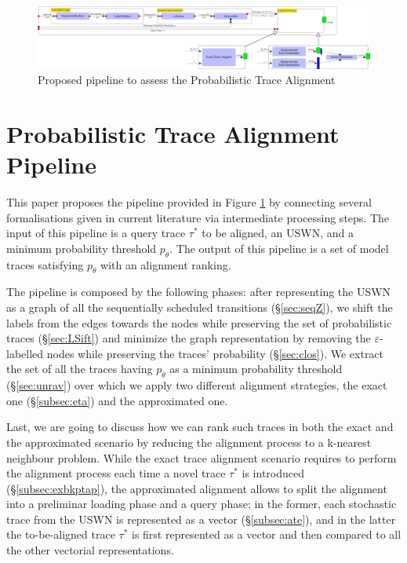 \begin{figure}[!t]
	\hspace*{-4cm}\includegraphics[width=1.7\textwidth]{images/pipeline}
	\caption{Proposed pipeline to assess the Probabilistic Trace Alignment}\label{fig:pipe}
\end{figure}


\section{Probabilistic Trace Alignment Pipeline}
This paper proposes the pipeline provided in Figure \ref{fig:pipe} by connecting several formalisations given in current literature via intermediate processing steps. The input of this pipeline is a query trace $\tau^*$ to be aligned, an USWN, and a minimum probability threshold $p_\theta$. The output of this pipeline is a set of model traces satisfying $p_\theta$ with an alignment ranking.

The pipeline is composed by the following phases: after representing the USWN as a graph of all the sequentially scheduled transitions (\S\ref{sec:seqZ}), we shift the labels from the edges towards the nodes while preserving the set of probabilistic traces (\S\ref{sec:LSift}) and minimize the graph representation by removing the $\varepsilon$-labelled nodes while preserving the traces' probability (\S\ref{sec:clos}). We extract the set of all the traces having $p_\theta$ as a minimum probability threshold (\S\ref{sec:unrav}) over which we  apply two different alignment strategies, the exact one (\S\ref{subsec:eta}) and the approximated one. 


Last, we are going to discuss how we can rank such traces in both the exact and the approximated scenario by reducing the alignment process to a k-nearest neighbour problem. While the exact trace alignment scenario requires to perform the alignment process each time a novel trace $\tau^*$ is introduced (\S\ref{subsec:exbkptap}), the approximated alignment allows to split the alignment into a preliminar loading phase and a query phase; in the former, each stochastic trace from the USWN is represented as a vector (\S\ref{subsec:ate}), and in the latter the to-be-aligned trace $\tau^*$ is first represented as a vector and then compared to all the other vectorial representations.  

